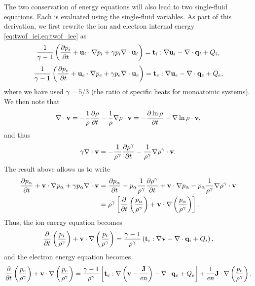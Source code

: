 \documentclass[oneside,a4paper,11pt]{report}
\begin{document}
The two conservation of energy equations will also lead to two single-fluid equations. Each is evaluated using the single-fluid variables. As part of this derivation, we first rewrite the ion and electron internal energy \cref{eq:twof_iei,eq:twof_iee} as
\begin{equation}
\label{eq:twof_ie}
    \frac{1}{\gamma-1} \left ( \frac{\partial p_i}{\partial t} + \mathbf{u}_i \cdot \nabla p_i + \gamma p_i \nabla \cdot \mathbf{u}_i \right ) = \mathbf{t}_i : \nabla \mathbf{u}_i - \nabla \cdot \mathbf{q}_i + Q_i,
\end{equation}
\begin{equation}
    \frac{1}{\gamma-1} \left ( \frac{\partial p_e}{\partial t} + \mathbf{u}_e \cdot \nabla p_e + \gamma p_e \nabla \cdot \mathbf{u}_e \right ) = \mathbf{t}_e : \nabla \mathbf{u}_e - \nabla \cdot \mathbf{q}_e + Q_e,
\end{equation}
where we have used $\gamma = 5/3$ (the ratio of specific heats for monoatomic systems). We then note that
\begin{equation}
    \nabla \cdot \mathbf{v} = -\frac{1}{\rho} \frac{\partial \rho}{\partial t} - \frac{1}{\rho} \nabla \rho \cdot \mathbf{v} = - \frac{\partial \ln{\rho} }{\partial t} -  \nabla \ln{\rho} \cdot \mathbf{v},
\end{equation}
and thus
\begin{equation}
    \gamma \nabla \cdot \mathbf{v} = -\frac{1}{\rho^\gamma} \frac{\partial \rho^\gamma}{\partial t} - \frac{1}{\rho^\gamma} \nabla \rho^\gamma \cdot \mathbf{v}.
\end{equation}
The result above allows us to write
\begin{align}
    \frac{\partial p_\alpha}{\partial t} + \mathbf{v} \cdot \nabla p_\alpha + \gamma p_\alpha \nabla \cdot \mathbf{v} 
    &=  \frac{\partial p_\alpha}{\partial t} - p_\alpha \frac{1}{\rho^\gamma} \frac{\partial \rho^\gamma}{\partial t} + \mathbf{v} \cdot \nabla p_\alpha - p_\alpha \frac{1}{\rho^\gamma} \nabla \rho^\gamma \cdot \mathbf{v} \nonumber \\
    & = \rho^\gamma \left [ \frac{\partial}{\partial t} \left ( \frac{p_\alpha}{\rho^\gamma} \right) + \mathbf{v} \cdot \nabla \left (\frac{p_\alpha}{\rho^\gamma} \right) \right ].
\end{align}
Thus, the ion energy equation becomes
\begin{equation}
\label{eq:generalized_MHD_pi}
   \frac{\partial}{\partial t} \left ( \frac{p_i}{\rho^\gamma} \right) + \mathbf{v} \cdot \nabla \left (\frac{p_i}{\rho^\gamma} \right) = \frac{\gamma - 1}{\rho^\gamma} \left( \mathbf{t}_i : \nabla \mathbf{v} - \nabla \cdot \mathbf{q}_i + Q_i \right),
\end{equation}
and the electron energy equation becomes
\begin{equation}
\label{eq:generalized_MHD_pe}
    \frac{\partial}{\partial t} \left ( \frac{p_e}{\rho^\gamma} \right) + \mathbf{v} \cdot \nabla \left (\frac{p_e}{\rho^\gamma} \right) = \frac{\gamma - 1}{\rho^\gamma} \left[ \mathbf{t}_e : \nabla \left (\mathbf{v} -\frac{\mathbf{J}}{e n} \right) - \nabla \cdot \mathbf{q}_e + Q_e \right] + \frac{1}{e n} \mathbf{J} \cdot \nabla \left ( \frac{ p_e}{\rho^\gamma} \right).
\end{equation}
\end{document}

